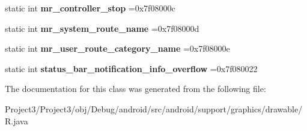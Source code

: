 \begin{DoxyCompactItemize}
static int {\bfseries mr\+\_\+controller\+\_\+stop} =0x7f08000c
\item 
\mbox{\label{classandroid_1_1support_1_1graphics_1_1drawable_1_1R_1_1string_acf9cc205378c378407c5895e8441fa25}} 
static int {\bfseries mr\+\_\+system\+\_\+route\+\_\+name} =0x7f08000d
\item 
\mbox{\label{classandroid_1_1support_1_1graphics_1_1drawable_1_1R_1_1string_a4e7fb853e4195c5bc71ce5f168c6502e}} 
static int {\bfseries mr\+\_\+user\+\_\+route\+\_\+category\+\_\+name} =0x7f08000e
\item 
\mbox{\label{classandroid_1_1support_1_1graphics_1_1drawable_1_1R_1_1string_af04f5d0e8546c5745a2dfd4cd03265ab}} 
static int {\bfseries status\+\_\+bar\+\_\+notification\+\_\+info\+\_\+overflow} =0x7f080022
\end{DoxyCompactItemize}


The documentation for this class was generated from the following file\+:\begin{DoxyCompactItemize}
\item 
Project3/\+Project3/obj/\+Debug/android/src/android/support/graphics/drawable/R.\+java\end{DoxyCompactItemize}
